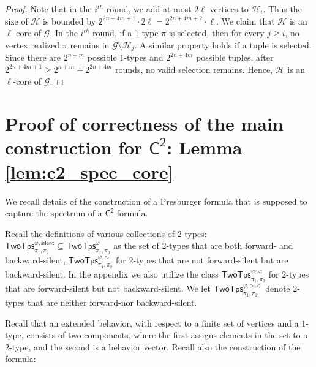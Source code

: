 \documentclass[10pt,a4paper]{article}
\theoremstyle{definition}
\theoremstyle{remark}
\newcommand{\cG}{\mathcal{G}}
\newcommand{\cH}{\mathcal{H}}
\newcommand{\cK}{\mathsf{TwoTps}}
\newcommand{\Ctwo}    {\mathsf{C^2}}
\newcommand{\twotypes}{\mathsf{TwoTps}}
\newcommand{\trif} {\triangleright}
\newcommand{\trib} {\triangleleft}
\newcommand{\cKvpnull}  {\cK^{\varphi, \mathsf{silent}}}
\newcommand{\cKvpf}     {\cK^{\varphi, \trif}}
\newcommand{\cKvpb}     {\cK^{\varphi, \trib}}
\newcommand{\cKvpfb}    {\cK^{\varphi, \trif\trib}}
\begin{document}
\begin{proof}
    Note that in the $i^{th}$ round, we add at most $2\ell$ vertices to $\cH_i$.
    Thus the size of $\cH$ is bounded by $2^{2n+4m+1} \cdot 2\ell = 2^{2n+4m+2} \cdot \ell$.
    We claim that $\cH$ is an $\ell$-core of $\cG$.
    In the $i^{th}$ round, if a 1-type $\pi$ is selected,
    then for every $j \ge i$,
    no vertex realized $\pi$ remains in $\cG \setminus \cH_j$.
    A similar property holds if a tuple is selected.
    Since there are $2^{n+m}$ possible 1-types and $2^{2n+4m}$ possible tuples,
    after $2^{2n+4m+1} \ge 2^{n+m} + 2^{2n+4m}$ rounds,
    no valid selection remains.
    Hence, $\cH$ is an $\ell$-core of $\cG$.
\end{proof}
\section*{Proof of correctness of the main construction for $\Ctwo$: Lemma \ref{lem:c2_spec_core}} \label{app:ctwoproof}

We recall details of
the construction of a Presburger formula that is supposed to capture the spectrum of a $\Ctwo$ formula.

Recall the definitions of various collections of $2$-types:
$\cKvpnull_{\pi_1, \pi_2} \subseteq \twotypes^\varphi_{\pi_1, \pi_2}$ as the set of 2-types that are both forward- and backward-silent,
$\cKvpf_{\pi_1, \pi_2}$ for 2-types that are not forward-silent but are backward-silent.
In the appendix we also utilize the class
$\cKvpb_{\pi_1, \pi_2}$ for 2-types that are forward-silent but not backward-silent. We let
$\cKvpfb_{\pi_1, \pi_2}$ denote 2-types that are neither forward-nor backward-silent.

Recall that an extended behavior, with respect to a finite set of vertices and a $1$-type, consists of two components, where the first assigns elements in the set to a $2$-type, and the second is a behavior vector. 
Recall also the construction of the formula:
\end{document}
